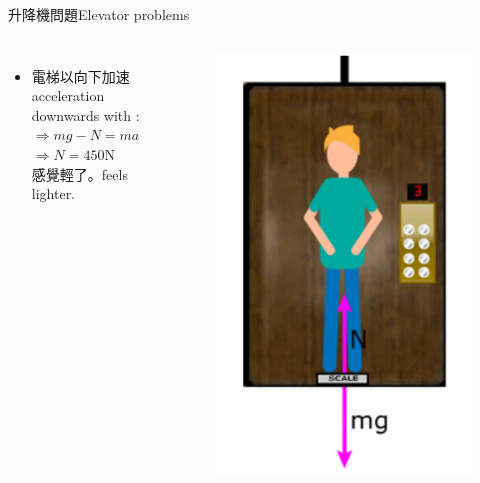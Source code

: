 \documentclass[beamer=true]{standalone}
\begin{document}
\begin{frame}{升降機問題Elevator problems}
\begin{columns}
\begin{itemize}
            \item 電梯以向下加速\\acceleration downwards with : \\$\Rightarrow mg-N=ma$\\$\Rightarrow N=450$N\\感覺輕了。feels lighter.
        \end{itemize}
        \begin{figure}[h!]
            \centering
            \includegraphics[width=\textwidth]{assets/6596ff5b.png}
        \end{figure}
    \end{columns}
\end{frame}
\end{document}
